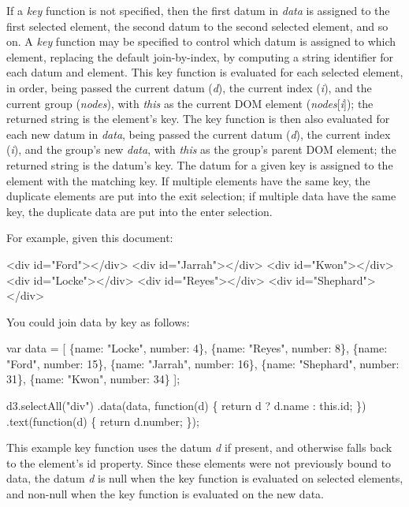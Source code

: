 If a {\itshape key} function is not specified, then the first datum in {\itshape data} is assigned to the first selected element, the second datum to the second selected element, and so on. A {\itshape key} function may be specified to control which datum is assigned to which element, replacing the default join-\/by-\/index, by computing a string identifier for each datum and element. This key function is evaluated for each selected element, in order, being passed the current datum ({\itshape d}), the current index ({\itshape i}), and the current group ({\itshape nodes}), with {\itshape this} as the current D\+OM element ({\itshape nodes}\mbox{[}{\itshape i}\mbox{]}); the returned string is the element’s key. The key function is then also evaluated for each new datum in {\itshape data}, being passed the current datum ({\itshape d}), the current index ({\itshape i}), and the group’s new {\itshape data}, with {\itshape this} as the group’s parent D\+OM element; the returned string is the datum’s key. The datum for a given key is assigned to the element with the matching key. If multiple elements have the same key, the duplicate elements are put into the exit selection; if multiple data have the same key, the duplicate data are put into the enter selection.

For example, given this document\+:


\begin{DoxyCode}
<div id="Ford"></div>
<div id="Jarrah"></div>
<div id="Kwon"></div>
<div id="Locke"></div>
<div id="Reyes"></div>
<div id="Shephard"></div>
\end{DoxyCode}


You could join data by key as follows\+:


\begin{DoxyCode}
var data = [
  \{name: "Locke", number: 4\},
  \{name: "Reyes", number: 8\},
  \{name: "Ford", number: 15\},
  \{name: "Jarrah", number: 16\},
  \{name: "Shephard", number: 31\},
  \{name: "Kwon", number: 34\}
];

d3.selectAll("div")
  .data(data, function(d) \{ return d ? d.name : this.id; \})
    .text(function(d) \{ return d.number; \});
\end{DoxyCode}


This example key function uses the datum {\itshape d} if present, and otherwise falls back to the element’s id property. Since these elements were not previously bound to data, the datum {\itshape d} is null when the key function is evaluated on selected elements, and non-\/null when the key function is evaluated on the new data.

